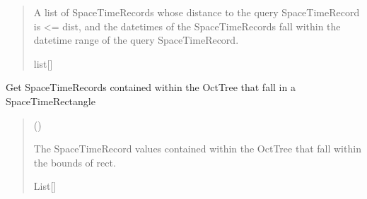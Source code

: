 \documentclass[letterpaper,10pt,english]{sphinxmanual}
\begin{document}
\begin{fulllineitems}
\begin{fulllineitems}
\begin{quote}
\begin{description}
\begin{itemize}
\end{itemize}

\sphinxAtStartPar
A list of SpaceTimeRecords whose distance to the
query SpaceTimeRecord is \textless{}= dist, and the datetimes of the
SpaceTimeRecords fall within the datetime range of the query
SpaceTimeRecord.

\sphinxAtStartPar
list{[}{\hyperref[\detokenize{record:geotrees.record.SpaceTimeRecord}]{}}{]}

\end{description}\end{quote}

\end{fulllineitems}


\begin{fulllineitems}
\label{\detokenize{octtree:geotrees.octtree.OctTree.query}}
\pysigstartsignatures
\pysiglinewithargsret
{}
{\sphinxparamcomma {}}
{}
\pysigstopsignatures
\sphinxAtStartPar
Get SpaceTimeRecords contained within the OctTree that fall in a
SpaceTimeRectangle
\begin{quote}\begin{description}
\sphinxAtStartPar
{} ({\hyperref[\detokenize{shape:geotrees.shape.SpaceTimeRectangle}]{}})

\sphinxAtStartPar
The SpaceTimeRecord values contained within the OctTree that fall
within the bounds of rect.

\sphinxAtStartPar
List{[}{\hyperref[\detokenize{record:geotrees.record.SpaceTimeRecord}]{}}{]}

\end{description}\end{quote}

\end{fulllineitems}



\end{fulllineitems}
\end{document}
